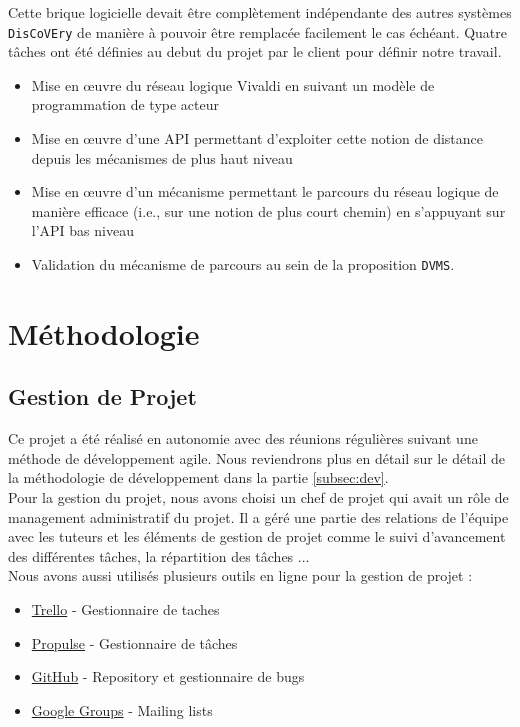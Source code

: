 \documentclass[11pt,a4paper]{article}
\begin{document}
Cette brique logicielle devait être complètement indépendante des autres systèmes \texttt{DisCoVEry} de manière à pouvoir être remplacée facilement le cas échéant. Quatre tâches ont été définies au debut du projet par le client pour définir notre travail.

\begin{itemize}
\item Mise en \oe uvre du réseau logique Vivaldi en suivant un modèle de programmation de type acteur
\item Mise en \oe uvre d'une API permettant d'exploiter cette notion de distance depuis les mécanismes de plus haut niveau
\item Mise en \oe uvre d'un mécanisme permettant le parcours du réseau logique de manière efficace (i.e., sur une notion de plus court chemin) en s'appuyant sur l'API bas niveau
\item Validation du mécanisme de parcours au sein de la proposition \texttt{DVMS}.
\end{itemize}

\section{Méthodologie}
\subsection{Gestion de Projet}
Ce projet a été réalisé en autonomie avec des réunions régulières suivant une méthode de développement agile. Nous reviendrons plus en détail sur le détail de la méthodologie de développement dans la partie \ref{subsec:dev}.\\

Pour la gestion du projet, nous avons choisi un chef de projet qui avait un rôle de management administratif du projet. Il a géré une partie des relations de l'équipe avec les tuteurs et les éléments de gestion de projet comme le suivi d'avancement des différentes tâches, la répartition des tâches ...\\

Nous avons aussi utilisés plusieurs outils en ligne pour la gestion de projet :
\begin{itemize}
\item \href{https://www.trello.com}{Trello} - Gestionnaire de taches
\item \href{http://ppulse.fr}{Propulse} - Gestionnaire de tâches
\item \href{http://www.github.com}{GitHub} - Repository et gestionnaire de bugs
\item \href{https://groups.google.com}{Google Groups} - Mailing lists
\end{itemize}
\end{document}
